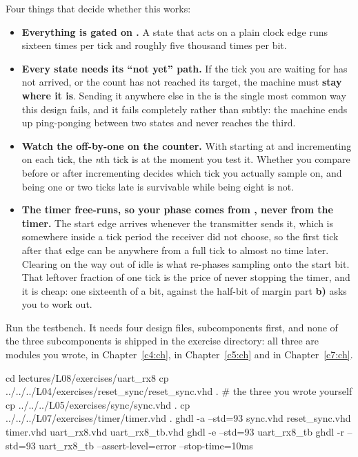 \begin{parts}
    Four things that decide whether this works:
    \begin{itemize}
      \item \textbf{Everything is gated on .} A state that acts on a plain clock edge
        runs sixteen times per tick and roughly five thousand times per bit.
      \item \textbf{Every state needs its ``not yet'' path.} If the tick you are waiting for has not
        arrived, or the count has not reached its target, the machine must \textbf{stay where it
        is}. Sending it anywhere else in the  is the single most common way this design
        fails, and it fails completely rather than subtly: the machine ends up ping-ponging between
        two states and never reaches the third.
      \item \textbf{Watch the off-by-one on the counter.} With  starting at  and
        incrementing on each tick, the \emph{n}th tick is  at the moment you
        test it. Whether you compare before or after incrementing decides which tick you actually
        sample on, and being one or two ticks late is survivable while being eight is not.
      \item \textbf{The timer free-runs, so your phase comes from , never from the
        timer.} The start edge arrives whenever the transmitter sends it, which is somewhere inside
        a tick period the receiver did not choose, so the first tick after that edge can be anywhere
        from a full tick to almost no time later. Clearing  on the way out of idle is
        what re-phases sampling onto the start bit. That leftover fraction of one tick is the price
        of never stopping the timer, and it is cheap: one sixteenth of a bit, against the half-bit
        of margin part \textbf{b)} asks you to work out.
    \end{itemize}
  \item Run the testbench. It needs four design files, subcomponents first, and none of the three
    subcomponents is shipped in the exercise directory: all three are modules you wrote,
     in Chapter~\ref{c4:ch},  in Chapter~\ref{c5:ch} and 
    in Chapter~\ref{c7:ch}.

\begin{shell}
cd lectures/L08/exercises/uart_rx8
cp ../../../L04/exercises/reset_sync/reset_sync.vhd .     # the three you wrote yourself
cp ../../../L05/exercises/sync/sync.vhd .
cp ../../../L07/exercises/timer/timer.vhd .
ghdl -a --std=93 sync.vhd reset_sync.vhd timer.vhd uart_rx8.vhd uart_rx8_tb.vhd
ghdl -e --std=93 uart_rx8_tb
ghdl -r --std=93 uart_rx8_tb --assert-level=error --stop-time=10ms
\end{shell}


\end{parts}
